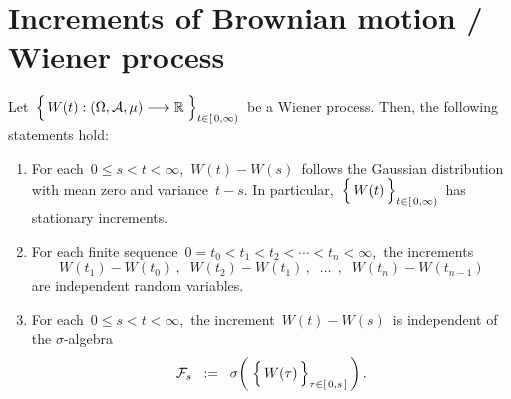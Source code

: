 

\section{Increments of Brownian motion / Wiener process}
\setcounter{theorem}{0}
\setcounter{equation}{0}


\renewcommand{\theenumi}{\roman{enumi}}
\renewcommand{\labelenumi}{\textnormal{(\theenumi)}$\;\;$}


\begin{proposition}
\label{WienerProcessIncrements}
\mbox{}
\vskip 0.2cm
\noindent
Let
\,$\left\{\,\overset{{\color{white}.}}{W}(t) : (\Omega,\mathcal{A},\mu) \longrightarrow \Re \;\right\}_{t \in[\,0,\infty)}$\,
be a Wiener process.
Then, the following statements hold:
\begin{enumerate}
\item
	For each \,$0 \leq s < t < \infty$,
	\,$W(t) - W(s)$\, follows the Gaussian distribution with mean zero and variance \,$t-s$.
	In particular,
	\,$\left\{\,\overset{{\color{white}.}}{W}(t)\,\right\}_{t \in[\,0,\infty)}$\,
	has stationary increments.
\item
	For each finite sequence \,$0 = t_{0} < t_{1} < t_{2} < \cdots < t_{n} < \infty$,\,
	the increments
	\begin{equation*}
	W(t_{1}) - W(t_{0})\,,\;\;
	W(t_{2}) - W(t_{1})\,,\;\;
	\ldots\;\,,\;\;
	W(t_{n}) - W(t_{n-1})
	\end{equation*}
	are independent random variables.
\item
	For each \,$0 \leq s < t < \infty$,\,
	the increment \,$W(t) - W(s)$\,
	is independent of the $\sigma$-algebra
	\begin{equation*}
	\mathcal{F}_{s}
	\;\; := \;\;
		\sigma\!\left(\;\left\{\,
			\overset{{\color{white}.}}{W}(\tau)
			\,\right\}_{\tau \in [\,0,s\,]}\,\right).
	\end{equation*}
\end{enumerate}
\end{proposition}
\proof
